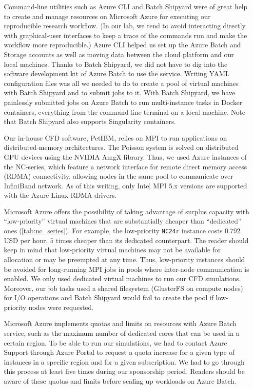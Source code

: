 \documentclass[10pt,journal,compsoc]{IEEEtran}
\begin{document}
Command-line utilities such as Azure CLI and Batch Shipyard were of great help to create and manage resources on Microsoft Azure for executing our reproducible research workflow.
(In our lab, we tend to avoid interacting directly with graphical-user interfaces to keep a trace of the commands run and make the workflow more reproducible.)
Azure CLI helped us set up the Azure Batch and Storage accounts as well as moving data between the cloud platform and our local machines.
Thanks to Batch Shipyard, we did not have to dig into the software development kit of Azure Batch to use the service.
Writing YAML configuration files was all we needed to do to create a pool of virtual machines with Batch Shipyard and to submit jobs to it.
With Batch Shipyard, we have painlessly submitted jobs on Azure Batch to run multi-instance tasks in Docker containers, everything from the command-line terminal on a local machine.
Note that Batch Shipyard also supports Singularity containers.

Our in-house CFD software, PetIBM, relies on MPI to run applications on distributed-memory architectures.
The Poisson system is solved on distributed GPU devices using the NVIDIA AmgX library.
Thus, we used Azure instances of the NC-series, which feature a network interface for remote direct memory access (RDMA) connectivity, allowing nodes in the same pool to communicate over InfiniBand network.
As of this writing, only Intel MPI 5.x versions are supported with the Azure Linux RDMA drivers.

Microsoft Azure offers the possibility of taking advantage of surplus capacity with ``low-priority'' virtual machines that are substantially cheaper than ``dedicated'' ones (\ref{tab:nc_series}).
For example, the low-priority \texttt{NC24r} instance costs $0.792$ USD per hour, $5$ times cheaper than its dedicated counterpart.
The reader should keep in mind that low-priority virtual machines may not be available for allocation or may be preempted at any time.
Thus, low-priority instances should be avoided for long-running MPI jobs in pools where inter-node communication is enabled.
We only used dedicated virtual machines to run our CFD simulations.
Moreover, our job tasks used a shared filesystem (GlusterFS on compute nodes) for I/O operations and Batch Shipyard would fail to create the pool if low-priority nodes were requested.

Microsoft Azure implements quotas and limits on resources with Azure Batch service, such as the maximum number of dedicated cores that can be used in a certain region.
To be able to run our simulations, we had to contact Azure Support through Azure Portal to request a quota increase for a given type of instances in a specific region and for a given subscription.
We had to go through this process at least five times during our sponsorship period.
Readers should be aware of these quotas and limits before scaling up workloads on Azure Batch.
\end{document}

